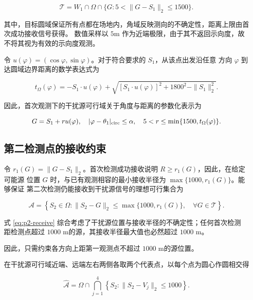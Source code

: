 \documentclass[withoutpreface,bwprint]{cumcmthesis} %
\begin{document}
\begin{equation}\label{eq:p2-source}
\mathcal T=W_1\cap\Omega\cap\{G:5<\|G-S_1\|_2\le1500\}.
\end{equation}

其中，目标圆域保证所有点都在场地内，角域反映测向的不确定性，距离上限由首次成功接收信号获得。
数值采样以 $5$m 作为近端极限，由于其不返回示向度，故不将其视为有效的示向度观测。

令 $u(\varphi)=(\cos\varphi,\sin\varphi)$。对于符合要求的 $S_1$，从该点出发沿任意
方向 $\varphi$ 到达圆域边界距离的数学表达式为

\begin{equation}\label{eq:p2-arena}
t_\Omega(\varphi)=-S_1\cdot u(\varphi)
+\sqrt{[S_1\cdot u(\varphi)]^2+1800^2-\|S_1\|_2^2}.
\end{equation}

因此，首次观测下的干扰源可行域关于角度与距离的参数化表示为

\begin{equation}\label{eq:p2-param}
G=S_1+r u(\varphi),\quad
|\varphi-\theta_1|_{\rm circ}\le\alpha,\quad
5<r\le\min\{1500,t_\Omega(\varphi)\}.
\end{equation}

\subsection{第二检测点的接收约束}

令 $r_1(G)=\|G-S_1\|_2$。首次检测成功接收说明 $R\ge r_1(G)$，因此，在给定可能源
位置 $G$ 时，与已有观测相容的最小接收半径为 $\max\{1000,r_1(G)\}$。能够保证
第二次检测仍能接收到干扰源信号的理想可行集合为

\begin{equation}\label{eq:p2-receive}
\mathcal A=\left\{S_2\in\Omega:
\|S_2-G\|_2\le\max\{1000,r_1(G)\},\quad\forall G\in\mathcal T\right\}.
\end{equation}

式 \eqref{eq:p2-receive} 综合考虑了干扰源位置与接收半径的不确定性；任何首次检测
距检测点超过 $1000$ m的源，其接收半径最大值也必然超过 $1000$ m。

因此，只需约束各方向上距第一观测点不超过 $1000$ m的源位置。

在干扰源可行域近端、远端左右两侧各取两个代表点，以每个点为圆心作圆相交得

\begin{equation}\label{eq:p2-feasible-region}
\hat{\mathcal A}
=
\Omega\cap
\bigcap_{j=1}^{4}
\left\{
S_2:
\|S_2-V_j\|_2\le 1000
\right\}.
\end{equation}
\end{document}
